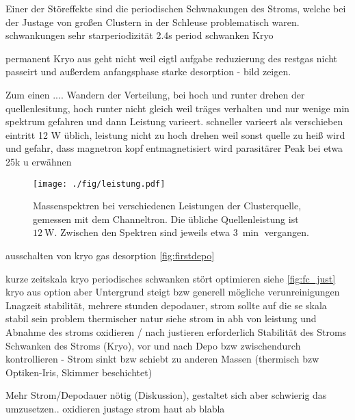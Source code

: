 Einer der Störeffekte sind die periodischen Schwnakungen des Stroms, welche bei der Justage von großen Clustern in der Schleuse problematisch waren.
schwankungen sehr starperiodizität 2.4s
period schwanken Kryo

permanent Kryo aus geht nicht weil eigtl aufgabe reduzierung des restgas nicht passeirt und außerdem anfangsphase starke desorption - bild zeigen.

Zum einen ....
Wandern der Verteilung, bei hoch und runter drehen der quellenlesitung, hoch runter nicht gleich weil träges verhalten und nur wenige min spektrum gefahren und dann Leistung varieert. schneller varieert als verschieben eintritt
12 W üblich, leistung nicht zu hoch drehen weil sonst quelle zu heiß wird und gefahr, dass magnetron kopf entmagnetisiert wird
parasitärer Peak bei etwa 25k u erwähnen \cite{gust}

\begin{figure}
  \centering
  \texttt{[image: ./fig/leistung.pdf]}
  \caption{Massenspektren bei verschiedenen Leistungen der Clusterquelle, gemessen mit dem Channeltron. Die übliche Quellenleistung ist $\SI{12}{\watt}$. Zwischen den Spektren sind jeweils etwa $\SI{3}{\min}$ vergangen.}
  \label{fig:leistung}
\end{figure}
ausschalten von kryo gas desorption \ref{fig:firstdepo}


kurze zeitskala kryo periodisches schwanken stört optimieren siehe \ref{fig:fc_just}
kryo aus option aber Untergrund steigt bzw generell mögliche verunreinigungen
Lnagzeit stabilität, mehrere stunden depodauer, strom sollte auf die se skala stabil sein
problem thermischer natur siehe strom in abh von leistung
und Abnahme des stroms oxidieren / nach justieren erforderlich
Stabilität des Stroms
Schwanken des Stroms (Kryo), vor und nach Depo bzw zwischendurch kontrollieren -
Strom sinkt bzw schiebt zu anderen Massen (thermisch bzw Optiken-Iris, Skimmer beschichtet)

Mehr Strom/Depodauer nötig (Diskussion), gestaltet sich aber schwierig das umzusetzen..
oxidieren justage strom haut ab blabla
